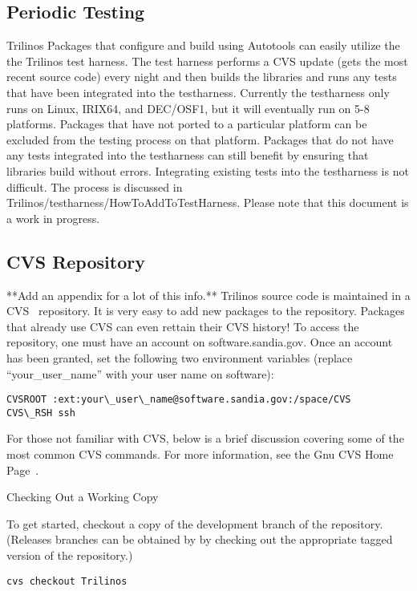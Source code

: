 \documentclass[12pt,relax]{SANDreport}
\begin{document}
	\subsection{Periodic Testing}
Trilinos Packages that configure and build using Autotools can easily 
utilize the the Trilinos test harness.  The test harness performs a CVS update
(gets the most recent source code) every night and then builds the libraries
and runs any tests that have been integrated into the testharness.  
Currently the testharness only runs on Linux, IRIX64, and DEC/OSF1, but it 
will eventually run on 5-8 platforms.  Packages that have not ported to a 
particular platform can be excluded from the testing process on that 
platform.  Packages that do not have any tests integrated into the 
testharness can still benefit by ensuring that libraries build without 
errors.  Integrating existing tests into the testharness is not difficult.  
The process is discussed in Trilinos/testharness/HowToAddToTestHarness.  
Please note that this document is a work in progress.

\subsection{CVS Repository}
**Add an appendix for a lot of this info.**
Trilinos source code is maintained in a CVS~\cite{CVS} repository.  It is 
very easy to add new packages to the repository.  Packages that already use 
CVS can even rettain their CVS history!  To access the repository, one must 
have an account on software.sandia.gov.  Once an account has been granted, 
set the following two environment variables (replace ``your\_user\_name'' 
with your user name on software):

\begin{verbatim}
CVSROOT :ext:your\_user\_name@software.sandia.gov:/space/CVS
CVS\_RSH ssh
\end{verbatim}

For those not familiar with CVS, below is a brief discussion covering some 
of the most common CVS commands.  For more information, see the Gnu CVS Home
Page~\cite{CVS}.

Checking Out a Working Copy

To get started, checkout a copy of the development branch of the repository.
(Releases branches can be obtained by by checking out the appropriate 
tagged version of the repository.)

\begin{verbatim}
cvs checkout Trilinos
\end{verbatim}
\end{document}
